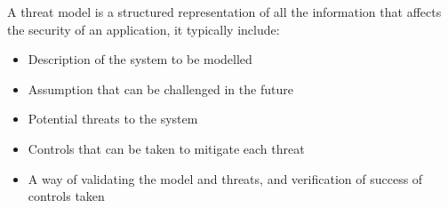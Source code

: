     A threat model is a structured representation of all the information that affects the security of an application, it typically include:
    \begin{itemize}
        \item Description of the system to be modelled 
        \item Assumption that can be challenged in the future 
        \item Potential threats to the system
        \item Controls that can be taken to mitigate each threat
        \item A way of validating the model and threats, and verification of success of controls taken
    \end{itemize}   
    
